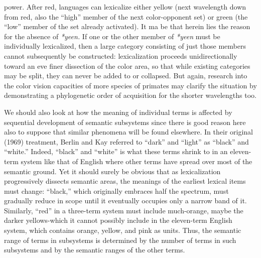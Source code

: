 power.
After red, languages can lexicalize either yellow (next wavelength
down from red, also the ``high'' member of the next color-opponent set) or green (the ``low'' member of the set already activated). It ma be that herein lies the reason for the absence of \textit{*yeen.} If one or the other member of \textit{*yeen} must be individually lexicalized, then a large category consisting of just those members cannot subsequently be constructed: lexicalization proceeds unidirectionally toward an eve finer dissection of the color area, so that while existing categories
may be split, they can never be added to or collapsed. But again, research into the color vision capacities of more species of primates may clarify the situation by demonstrating a phylogenetic order of acquisition for the shorter wavelengths too.

We should also look at how the meaning of individual terms is affected by sequential development of semantic subsystems since there is good reason here also to suppose that similar phenomena will be found elsewhere. In their original (1969) treatment, Berlin and Kay referred to ``dark'' and ``light'' as ``black'' and ``white.'' Indeed, ``black'' and ``white'' is what these terms shrink to in an eleven-term system like that of English where other terms have spread over most of the seman\-tic ground. Yet it should surely be obvious that as lexicalization pro\-gressively dissects semantic areas, the meanings of the earliest lexical items must change: ``black,'' which originally embraces half the spec\-trum, must gradually reduce in scope until it eventually occupies only a narrow band of it. Similarly, ``red'' in a three-term system must include much-orange, maybe the darker yellows-which it cannot possibly include in the eleven-term English system, which contains orange, yellow, and pink as units. Thus, the semantic range of terms in subsystems is determined by the number of terms in such subsystems and by the semantic ranges of the other terms.

